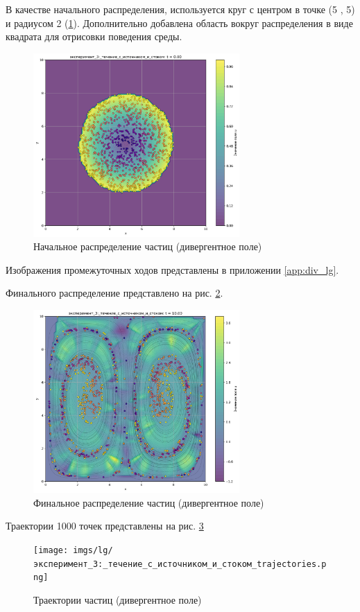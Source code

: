 В качестве начального распределения, используется круг с центром в точке (5 , 5) и радиусом 2 (\ref{fig:lg_div_begin}). Дополнительно добавлена область вокруг распределения в виде квадрата для отрисовки поведения среды.
\begin{figure}
	\centering
	\includegraphics[width=0.7\textwidth]{imgs/lg/эксперимент_3:_течение_с_источником_и_стоком_t0.00.png}
	\caption{Начальное распределение частиц (дивергентное поле)}
	\label{fig:lg_div_begin}
\end{figure}

Изображения промежуточных ходов представлены в приложении \ref{app:div_lg}.

Финального распределение представлено на рис. \ref{fig:lg_div_finall}.
\begin{figure}
	\centering
	\includegraphics[width=0.7\textwidth]{imgs/lg/эксперимент_3:_течение_с_источником_и_стоком_t10.00.png}
	\caption{Финальное распределение частиц (дивергентное поле)}
	\label{fig:lg_div_finall}
\end{figure}
Траектории 1000 точек представлены на рис. \ref{fig:lg_div_tr}
\begin{figure}
	\centering
	\texttt{[image: imgs/lg/эксперимент\_3:\_течение\_с\_источником\_и\_стоком\_trajectories.png]}
	\caption{Траектории частиц (дивергентное поле)}
	\label{fig:lg_div_tr}
\end{figure}


